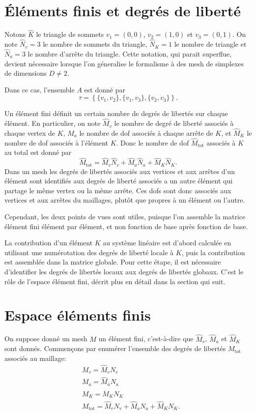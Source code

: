 \section{Éléments finis et degrés de liberté}
Notons $\hat K$ le triangle de sommets $v_1 = (0,0)$, $v_2 = (1,0)$ et
$v_3 = (0, 1)$. On note $\hat N_v = 3$ le nombre de sommets du
triangle, $\hat N_K = 1$ le nombre de triangle et $\hat N_a = 3$ le
nombre d'arrête du triangle. Cette notation, qui parait superflue,
devient nécessaire lorsque l'on géneralise le formalisme à des
mesh de simplexes de dimensions $D \neq 2$.

Dans ce cas, l'ensemble $A$ est donné par
\begin{equation}
  \tau = \left\{ \{v_1, v_2\}, \{v_1, v_3\}, \{v_2, v_3\} \right\}.
\end{equation}

Un élément fini définit un certain nombre de degrés de
libertés sur chaque élément. En particulier, on note $\hat M_v$ le
nombre de degré de liberté associés à chaque vertex de $K$,
$\hat M_a$ le nombre de dof associés à chaque arrête de $K$, et
$\hat M_K$ le nombre de dof associés à l'élément $K$. Donc le
nombre de dof $\hat M_\text{tot}$ associés à $K$ au total est donné par
\begin{equation}
  \hat M_\text{tot} = \hat M_v \hat N_v + \hat M_a \hat N_a + \hat M_K \hat N_K.
\end{equation}
Dans un mesh les degrés de libertés associés aux vertices et aux
arrêtes d'un élément sont identifiés aux degrés de liberté
associés a un autre élément qui partage le même vertex ou la
même arrête. Ces dofs sont donc associés aux vertices et aux
arrêtes du maillages, plutôt que propres à un élément ou
l'autre.

Cependant, les deux points de vues sont utiles, puisque l'on assemble
la matrice élément fini élément par élément, et non fonction de
base après fonction de base.

La contribution d'un élément $K$ au système linéaire est d'abord
calculée en utilisant une numérotation des degrés de liberté
locale à $K$, puis la contribution est assemblée dans la matrice
globale. Pour cette étape, il est nécessaire d'identifier les
degrés de libertés locaux aux degrés de libertés globaux. C'est
le rôle de l'espace élément fini, décrit plus en détail dans
la section qui suit.

\section{Espace éléments finis}
On suppose donné un mesh $M$ un élément fini, c'est-à-dire que
$\hat M_v$, $\hat M_a$ et $\hat M_K$ sont donnés. Commen\c cons par
enumérer l'ensemble des degrés de libertés $M_\text{tot}$
associés au maillage:
\begin{align}
  & M_v = \hat M_v N_v\\
  & M_a = \hat M_a N_a\\
  & M_K = \hat M_K N_K\\
  & M_\text{tot} = \hat M_v N_v + \hat M_a N_a + \hat M_K N_K.
\end{align}

